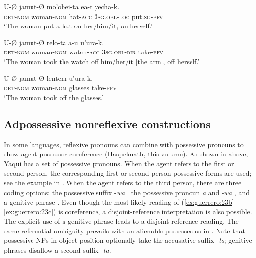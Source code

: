 \documentclass[output=paper]{langscibook}
\begin{document}
\ea%
    \label{ex:guerrero:22}

\ea
\label{ex:guerrero:22a}
\gll U-Ø  jamut-Ø  mo’obei-ta  ea-t  yecha-k.\\
      \textsc{det-nom}  woman-\textsc{nom}  hat-\textsc{acc} \textsc{3sg.obl-loc}  put\textsc{.sg}{}-\textsc{pfv}\\
\glt ‘The woman put a hat on her/him/it, on herself.’

\ex
\label{ex:guerrero:22b}
\gll U-Ø   jamut-Ø  relo-ta    a-u  u’ura-k.\\
    \textsc{det-nom}  woman-\textsc{nom}  watch-\textsc{acc}    \textsc{3sg.obl-dir}   take\textsc{{}-pfv}\\
\glt ‘The woman took the watch off him/her/it [the arm], off herself.’

\ex
\label{ex:guerrero:22c}
\gll U-Ø   jamut-Ø  lentem  u’ura-k.\\
    \textsc{det-nom}  woman-\textsc{nom}  glasses    take\textsc{{}-pfv}\\
\glt ‘The woman took off the glasses.’
\z
\z



\subsection{Adpossessive nonreflexive constructions}\label{sec:guerrero:3.5}



In some languages, reflexive pronouns can combine with possessive pronouns to show agent-possessor coreference (Haspelmath, this volume). As shown in  above, Yaqui has a set of possessive pronouns. When the agent refers to the first or second person, the corresponding first or second person possessive forms are used; see the example in . When the agent refers to the third person, there are three coding options: the possessive suffix -\textit{wa} , the possessive pronoun \textit{a} and -\textit{wa} , and a genitive phrase . Even though the most likely reading of (\ref{ex:guerrero:23b}--\ref{ex:guerrero:23c}) is coreference, a disjoint-reference interpretation is also possible. The explicit use of a genitive phrase leads to a disjoint-reference reading. The same referential ambiguity prevails with an alienable possessee as in . Note that possessive NPs in object position optionally take the accusative suffix -\textit{ta}; genitive phrases disallow a second suffix -\textit{ta}.
\end{document}
